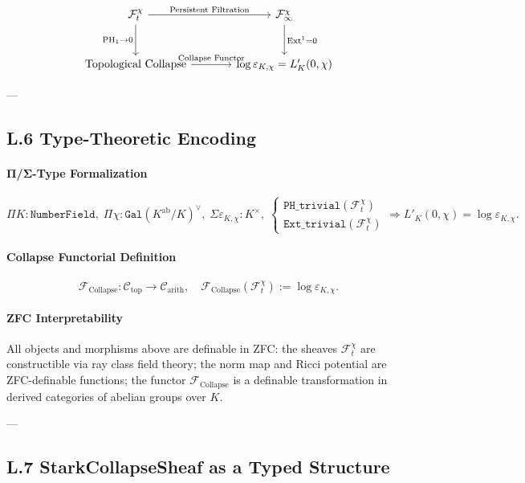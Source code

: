 \documentclass[11pt]{article}
\begin{document}
\[
\begin{tikzcd}[row sep=large, column sep=large]
\mathcal{F}^\chi_t \arrow[r, "\text{Persistent Filtration}"] \arrow[d, "\mathrm{PH}_1 \to 0"'] 
& \mathcal{F}^\chi_\infty \arrow[d, "\mathrm{Ext}^1 = 0"] \\
\text{Topological Collapse} \arrow[r, "\text{Collapse Functor}"] 
& \log \varepsilon_{K,\chi} = L'_K(0,\chi)
\end{tikzcd}
\]

---

\subsection*{L.6 Type-Theoretic Encoding}

\paragraph{Π/Σ-Type Formalization}

\[
\Pi K : \texttt{NumberField}, \;
\Pi \chi : \texttt{Gal}(K^{\text{ab}}/K)^\vee, \;
\Sigma \varepsilon_{K,\chi} : K^\times, \;
\begin{cases}
\texttt{PH\_trivial}(\mathcal{F}^\chi_t) \\
\texttt{Ext\_trivial}(\mathcal{F}^\chi_t)
\end{cases}
\Rightarrow
L'_K(0,\chi) = \log \varepsilon_{K,\chi}.
\]

\paragraph{Collapse Functorial Definition}

\[
\mathcal{F}_{\mathrm{Collapse}} : \mathcal{C}_{\mathrm{top}} \to \mathcal{C}_{\mathrm{arith}},
\quad
\mathcal{F}_{\mathrm{Collapse}}(\mathcal{F}_t^\chi) := \log \varepsilon_{K,\chi}.
\]

\paragraph{ZFC Interpretability}

All objects and morphisms above are definable in ZFC: the sheaves $\mathcal{F}^\chi_t$ are constructible via ray class field theory; the norm map and Ricci potential are ZFC-definable functions; the functor $\mathcal{F}_{\mathrm{Collapse}}$ is a definable transformation in derived categories of abelian groups over $K$.

---

\subsection*{L.7 StarkCollapseSheaf as a Typed Structure}
\end{document}
